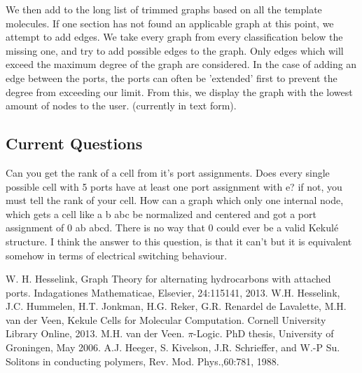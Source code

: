 \documentclass[12pt]{article}
\begin{document}
We then add to the long list of trimmed graphs based on all the template molecules. If one section has not found an applicable graph at this point, we attempt to add edges. We take every graph from every classification below the missing one, and try to add possible edges to the graph. Only edges which will exceed the maximum degree of the graph are considered. In the case of adding an edge between the ports, the ports can often be 'extended' first to prevent the degree from exceeding our limit. From this, we display the graph with the lowest amount of nodes to the user. (currently in text form).

\subsection{Current Questions}

Can you get the rank of a cell from it's port assignments. 
Does every single possible cell with 5 ports have at least one port assignment with e? if not, you must tell the rank of your cell.
How can a graph which only one internal node, which gets a cell like { a b abc } be normalized and centered and got a port assignment of 0 ab abcd. There is no way that 0 could ever be a valid Kekul\'e structure. I think the answer to this question, is that it can't  but it is equivalent somehow in terms of electrical switching behaviour. 


\begin{thebibliography}{abrv}

 W. H. Hesselink, Graph Theory for alternating hydrocarbons with attached ports. Indagationes Mathematicae, Elsevier, 24:115141, 2013.
 W.H. Hesselink, J.C. Hummelen, H.T. Jonkman, H.G. Reker, G.R. Renardel de Lavalette, M.H. van der Veen, Kekule Cells for Molecular Computation. Cornell University Library Online, 2013.
 M.H. van der Veen. $\pi$-Logic. PhD thesis, University of Groningen, May 2006.
 A.J. Heeger, S. Kivelson, J.R. Schrieffer, and W.-P Su. Solitons in conducting polymers, Rev. Mod. Phys.,60:781, 1988.

\end{thebibliography}
\end{document}
